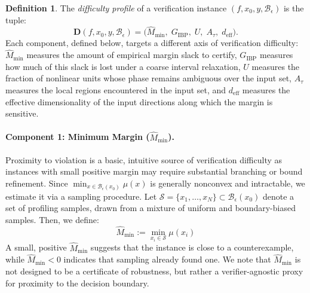 \documentclass{article}
\theoremstyle{definition}
\newtheorem{definition}[theorem]{Definition}
\begin{document}
\begin{definition}%
\label{def:profile}
The \emph{difficulty profile} of a verification instance $(f, x_0, y, \mathcal{B}_\epsilon)$ is the tuple:
\begin{equation}\label{eq:profile}
    \mathbf{D}(f, x_0, y, \mathcal{B}_\epsilon) = \bigl(\widehat M_{\min},\; G_{\mathrm{IBP}},\; U, \;A_\tau,\; d_{\mathrm{eff}}\bigr) .  
\end{equation}
Each component, defined below, targets a different axis of verification difficulty: $\widehat M_{\min}$ measures the amount of empirical margin slack %
to certify, 
$G_{\mathrm{IBP}}$ measures how much of this slack is lost under a coarse interval relaxation, 
$U$ measures the fraction of nonlinear units whose phase remains ambiguous over the input set, 
$A_\tau$ measures the local regions encountered in the input set, 
and $d_{\mathrm{eff}}$ measures the effective dimensionality of the input directions along which the margin is sensitive. 
\end{definition}

\paragraph{Component 1: Minimum Margin ($\widehat{M}_{\min}$).} 
Proximity to violation is a basic, intuitive source of verification difficulty as instances with small positive margin may require substantial branching or bound refinement. Since $\min_{x\in\mathcal{B}_\epsilon(x_0)}\mu(x)$ is generally nonconvex and intractable, we estimate it via a sampling procedure. Let $\mathcal{S} = \{x_1, \dots, x_N \} \subset \mathcal{B}_\epsilon(x_0)$ denote a set of profiling samples, drawn from a mixture of uniform and boundary-biased samples. Then, we define:
\begin{equation}
    \widehat{M}_{\min} := \min_{x_i \in \mathcal {S}} \mu(x_i) \label{mhat}
\end{equation}
A small, positive $\widehat{M}_{\min}$ suggests that the instance is close to a counterexample, while $\widehat{M}_{\min} < 0$ indicates that %
sampling already found one. 
We note that $\widehat{M}_{\min}$ is not designed to be a certificate of robustness, %
but rather a verifier-agnostic proxy for %
proximity to the decision boundary. 
 
\end{document}
